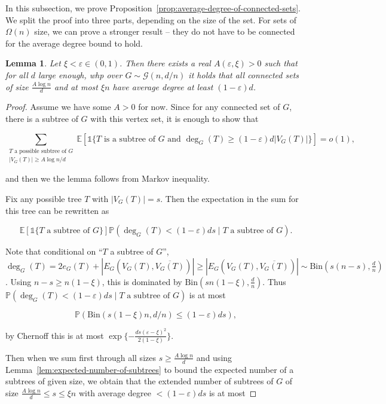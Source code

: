 \documentclass[11pt]{article}
\theoremstyle{plain}
\newtheorem{lemma}[theorem]{Lemma}
\let\epsilon=\varepsilon
\newcommand{\G}{\mathcal{G}}
\newcommand{\E}{\mathds{E}}
\renewcommand{\P}{\mathds{P}}
\newcommand{\1}{\mathbb{1}}
\newcommand{\Bin}{\text{Bin}}
\begin{document}
In this subsection, we prove Proposition~\ref{prop:average-degree-of-connected-sets}. We split the proof into three parts, depending on the size of the set. For sets of \(\Omega(n)\) size, we can prove a stronger result -- they do not have to be connected for the average degree bound to hold.

\begin{lemma}\label{lem:avg-deg-of-small-connected-sets}
    Let \(\xi < \epsilon \in(0,1)\). Then there exists a real \(A(\epsilon,\xi) > 0\) such that for all \(d\) large enough, whp over \(G\sim\G(n,d/n)\) it holds that all connected sets of size \(\tfrac{A\log n}{d}\) and at most \(\xi n\) have average degree at least \((1-\epsilon)d\).
\end{lemma}
\begin{proof}
    Assume we have some \(A > 0\) for now. 
    Since for any connected set of \(G\), there is a subtree of \(G\) with this vertex set, it is enough to show that

    \[
    \sum_{\substack{T\text{ a possible subtree of }G\\|V_G(T)|\geq A\log n/d}} \E[\1\{T\text{ is a subtree of }G\text{ and }\deg_G(T)\geq(1-\epsilon)d|V_G(T)|\}] = o(1),
    \]

    and then we the lemma follows from Markov inequality.

    Fix any possible tree \(T\) with \(|V_G(T)| = s\). Then the expectation in the sum for this tree can be rewritten as

    \[\E[\1\{T\text{ a subtree of }G\}]\P(\deg_G(T) < (1-\epsilon)ds \mid T\text{ a subtree of } G).\]

    Note that conditional on ``\(T\) a subtree of \(G\)'', \(\deg_G(T) = 2e_G(T) + |E_G(V_G(T),\overline{V_G(T)})| \geq |E_G(V_G(T),\overline{V_G(T)})| \sim \Bin(s(n-s),\tfrac{d}{n})\). Using \(n-s\geq n(1-\xi)\), this is dominated by \(\Bin(sn(1-\xi),\tfrac dn)\). Thus \(\P(\deg_G(T) < (1-\epsilon)ds \mid T\text{ a subtree of } G)\) is at most 

    \[
    \P(\Bin(s(1-\xi)n, d/n) \leq (1-\epsilon)ds),
    \]

    by Chernoff 
this is at most \(\exp\{-\frac{ds(\epsilon-\xi)^2}{2(1-\xi)}\}\).

    Then when we sum first through all sizes \(s\geq\tfrac{A\log n}{d}\) and using Lemma~\ref{lem:expected-number-of-subtrees} to bound the expected number of a subtrees of given size, we obtain that the extended number of subtrees of \(G\) of size \(\tfrac{A\log n}{d}\leq s\leq \xi n\) with average degree \(<(1-\epsilon)ds\) is at most


\end{proof}
\end{document}
